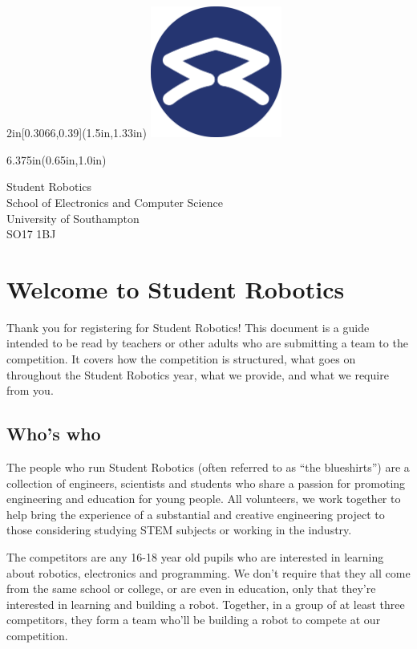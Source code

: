 \documentclass[a4paper]{article}
\begin{document}
\begin{textblock*}{2in}[0.3066,0.39](1.5in,1.33in)
    \includegraphics[width=1.7in]{sr-logo.pdf}
\end{textblock*}
\begin{textblock*}{6.375in}(0.65in,1.0in)
    \sffamily
    \begin{flushright}
    \sffamily \Huge \color{SRblue}
    Student Robotics\\ \large
    \smallskip
    School of Electronics and Computer Science\\
    University of Southampton\\
    SO17 1BJ
    \end{flushright}
\end{textblock*}
\color{black}
\vspace*{0.4in}

\section*{Welcome to Student Robotics}

Thank you for registering for Student Robotics! This document is a guide intended to
be read by teachers or other adults who are submitting a team to the competition. It
covers how the competition is structured, what goes on throughout the Student Robotics
year, what we provide, and what we require from you.


\subsection*{Who's who}

The people who run Student Robotics (often referred to as ``the blueshirts'')
are a collection of engineers, scientists and students who share a passion for
promoting engineering and education for young people. All volunteers, we work
together to help bring the experience of a substantial and creative engineering
project to those considering studying STEM subjects or working in the industry.

The competitors are any 16-18 year old pupils who are interested in learning
about robotics, electronics and programming. We don't require that they all
come from the same school or college, or are even in education, only that
they're interested in learning and building a robot. Together, in a group of at
least three competitors, they form a team who'll be building a robot to compete
at our competition.
\end{document}
